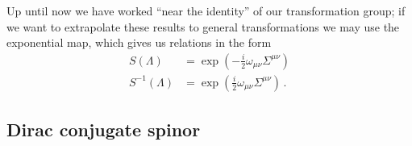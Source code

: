 \documentclass[main.tex]{subfiles}
\begin{document}
Up until now we have worked ``near the identity'' of our transformation group; if we want to extrapolate these results to general transformations we may use the exponential map, which gives us relations in the form 
%
\begin{align}
S(\Lambda ) &= \exp( -\frac{i}{2} \omega_{\mu \nu } \Sigma^{\mu \nu })  \\
S^{-1} (\Lambda ) &= \exp(\frac{i}{2} \omega_{\mu \nu } \Sigma^{\mu \nu })
\,.
\end{align}
%

\subsection{Dirac conjugate spinor}
\end{document}
